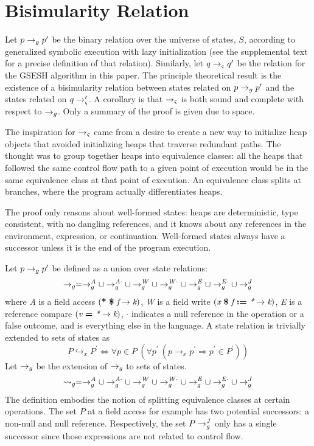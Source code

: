 \section{Bisimularity Relation}
Let $p \rightarrow_{g} p^\prime$ be the binary relation over the universe of states, $S$,
according to generalized symbolic execution with lazy initialization
(see the supplemental text for a precise definition of that
relation). Similarly, let $q \rightarrow_{\varsigma} q^\prime$ be the relation for the GSESH
algorithm in this paper. The principle theoretical result is the
existence of a bisimularity relation between states related on $p \rightarrow_{g} p^\prime$
and the states related on $q \rightarrow_{\varsigma} ^\prime$. A corollary is that $\rightarrow_{\varsigma}$ is
both sound and complete with respect to $\rightarrow_{g}$. Only a summary of the
proof is given due to space.

The inspiration for $\rightarrow_{\varsigma}$ came from a desire to create
a new way to initialize heap objects that avoided initializing heaps
that traverse redundant paths. The thought was to group together heaps
into equivalence classes: all the heaps that followed the same control
flow path to a given point of execution would be in the same
equivalence class at that point of execution. An equivalence class
splits at branches, where the program actually differentiates heaps.

The proof only reasons about well-formed states: heaps are
deterministic, type consistent, with no dangling references, and it
knows about any references in the environment, expression, or
continuation. Well-formed states always have a successor unless it is
the end of the program execution.

Let $p \rightarrow_{g} p^\prime$ be defined as a union over state relations:
$$
\rightarrow_{g} = \rightarrow_{g}^\mathit{A} \cup  \rightarrow_{g}^\mathit{A\cdot} \cup \rightarrow_{g}^\mathit{W} \cup \rightarrow_{g}^\mathit{W\cdot} \cup \rightarrow_{g}^\mathit{E} \cup \rightarrow_{g}^\mathit{E\cdot} \cup \rightarrow_{g}^{J}
$$
where \emph{A} is a field access $( \textbf{*}\ \textbf{\$}\ \emph{f}
\rightarrow \emph{k})$, \emph{W} is a field write $(
\emph{x}\ \textbf{\$}\ \emph{f}\ \textbf{:=}\ \emph{*} \rightarrow
\emph{k})$, \emph{E} is a reference compare $(
\emph{v}\ \textbf{=}\ \emph{*} \rightarrow \emph{k})$, $\cdot$
indicates a null reference in the operation or a false outcome, and
\emph{\com} is everything else in the language. A state relation is trivially extended to sets of states as
$$
P \hookrightarrow_x P^\prime \Longleftrightarrow \forall p \in P\ (\forall p^\prime\ (p \rightarrow_x p^\prime \Rightarrow p^\prime \in P^\prime))
$$
Let $\rightarrow_{g}$ be the extension of $\rightarrow_{g}$ to sets of states.
$$
\leadsto_{g} = \rightarrow_{g}^\mathit{A}
\cup \rightarrow_{g}^\mathit{A\cdot} \cup \rightarrow_{g}^\mathit{W} \cup
\rightarrow_{g}^\mathit{W\cdot} \cup \rightarrow_{g}^\mathit{E} \cup \rightarrow_{g}^\mathit{E\cdot}
\cup \rightarrow_{g}^{J}
$$
The definition embodies the notion of splitting equivalence classes at
certain operations. The set $P$ at a field access for example has two
potential successors: a non-null and null reference. Respectively, the
set $P \rightarrow_{g}^{J}$ only has a single successor since those expressions
are not related to control flow.

